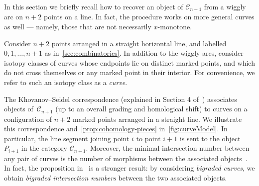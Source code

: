 \documentclass{amsart}
\theoremstyle{definition}
\newcommand{\darkblue}{\color{darkblue}} %
\newcommand{\defn}[1]{\textsl{\darkblue #1}} %
\begin{document}
In this section we briefly recall how to recover an object of \(\mathcal{C}_{n+1}\) from a wiggly arc on \(n+2\) points on a line.
In fact, the procedure works on more general curves as well --- namely, those that are not necessarily \(x\)-monotone.

Consider \(n+2\) points arranged in a straight horizontal line, and labelled \(0,1, \ldots, n+1\) as in~\cref{sec:combinatorics}.
In addition to the wiggly arcs, consider isotopy classes of curves whose endpoints lie on distinct marked points, and which do not cross themselves or any marked point in their interior.
For convenience, we refer to such an isotopy class as a \defn{curve}.

The Khovanov--Seidel correspondence (explained in Section 4 of~\cite{kho.sei:02}) associates objects of~\(\mathcal{C}_{n+1}\) (up to an overall grading and homological shift) to curves on a configuration of \(n+2\) marked points arranged in a straight line.
We illustrate this correspondence and~\cref{prop:cohomology-pieces} in~\cref{fig:curveModel}.
In particular, the line segment joining point \(i\) to point \(i+1\) is sent to the object \(P_{i+1}\) in the category \(\mathcal{C}_{n+1}\).
Moreover, the minimal intersection number between any pair of curves is the number of morphisms between the associated objects~\cite[Prop.~4.9]{kho.sei:02}.
In fact, the proposition in~\cite{kho.sei:02} is a stronger result: by considering \emph{bigraded curves}, we obtain \emph{bigraded intersection numbers} between the two associated objects.
\end{document}
